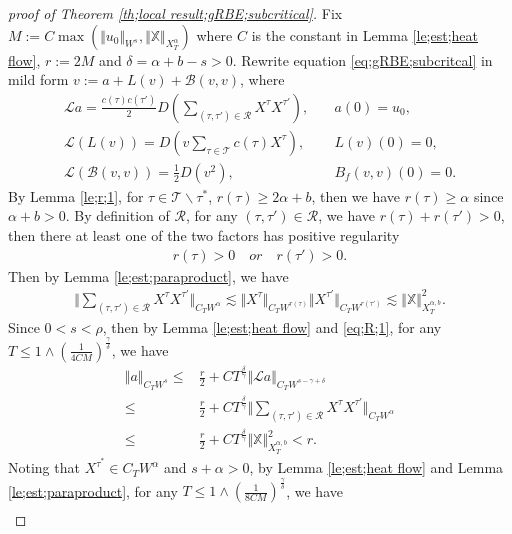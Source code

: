 \documentclass{article}
\numberwithin{equation}{section}
\newcommand{\m}{\mathbb}
\newcommand{\ml}{\mathcal}
\begin{document}
\begin{proof}[proof of Theorem \ref{th;local result;gRBE;subcritical}]
	Fix $M:=C\max(\Vert u_0\Vert_{W^s},\Vert \m X\Vert_{X_T^\alpha})$ where $C$ is the constant in Lemma \ref{le;est;heat flow}, $r:=2M$ and $\delta=\alpha+b-s>0$. Rewrite equation \eqref{eq;gRBE;subcritcal} in mild form $v:=a+L(v)+\ml B(v,v)$, where 
	\begin{align*}
		\ml La=\frac{c(\tau)c(\tau')}{2}D(\sum_{(\tau,\tau')\in\ml R}X^{\tau}X^{\tau'}),\quad &a(0)=u_0,\\
		\ml L(L(v))=D(v\sum_{\tau\in \ml T}c(\tau)X^{\tau}),\quad &L(v)(0)=0,\\
		\ml L(\ml B(v,v))=\frac{1}{2}D(v^2),\quad &B_f(v,v)(0)=0.
	\end{align*}
	  By Lemma \ref{le;r;1}, for $\tau\in\ml T\backslash\tau^*$, $r(\tau)\geq 2\alpha+b$, then we have $r(\tau)\geq\alpha$ since $\alpha+b>0$. By definition of $\ml R$, for any $(\tau,\tau')\in\ml R$, we have $r(\tau)+r(\tau')>0$, then there at least one of the two factors has positive regularity
	\begin{align*}
		r(\tau)>0\quad or\quad r(\tau')>0.
	\end{align*}
	Then by Lemma \ref{le;est;paraproduct}, we have
	\begin{equation}\label{eq;R;1}
		\begin{aligned}
			\Vert \sum_{(\tau,\tau')\in\ml R}X^{\tau}X^{\tau'}\Vert_{C_TW^\alpha}\lesssim\Vert X^{\tau}\Vert_{C_TW^{r(\tau)}}\Vert X^{\tau'}\Vert_{C_TW^{r(\tau')}}\lesssim \Vert \m X\Vert_{X_T^{\alpha,b}}^2.
		\end{aligned}
	\end{equation}
	 Since $0<s<\rho$, then by Lemma \ref{le;est;heat flow} and \eqref{eq;R;1}, for any $T\leq 1\wedge (\frac{1}{4CM})^{\frac{\gamma}{\delta}}$, we have
	\begin{align*}
		\Vert a\Vert_{C_{T}W^{s}}\leq& \frac{r}{2}+CT^{\frac{\delta}{\gamma}} \Vert \ml La\Vert_{C_{T}W^{s-\gamma+\delta}}\\
		\leq&\frac{r}{2}+CT^{\frac{\delta}{\gamma}} \Vert \sum_{(\tau,\tau')\in\ml R}X^{\tau}X^{\tau'}\Vert_{C_TW^\alpha}\\
		\leq&\frac{r}{2}+CT^{\frac{\delta}{\gamma}} \Vert \m X\Vert_{X_T^{\alpha,b}}^2<r.
	\end{align*}
     Noting that $X^{\tau^*}\in C_TW^{\alpha}$ and $s+\alpha>0$,  by Lemma \ref{le;est;heat flow} and Lemma \ref{le;est;paraproduct}, for any $T\leq 1\wedge (\frac{1}{8CM})^{\frac{\gamma}{\delta}}$,  we have
     \begin{align*}

\end{align*}
\end{proof}
\end{document}

